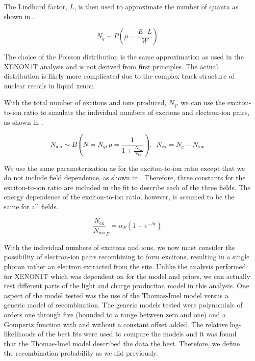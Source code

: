 The Lindhard factor, $L$, is then used to approximate the number of quanta as shown in .

\begin{equation}
        \label{eqn:nerix_nr_quanta}
        N_q \sim P \left( \mu = \frac{E \cdot L}{W} \right)
\end{equation}

The choice of the Poisson distribution is the same approximation as used in the XENON1T analysis and is not derived from first principles.  The actual distribution is likely more complicated due to the complex track structure of nuclear recoils in liquid xenon.

With the total number of excitons and ions produced, $N_q$, we can use the exciton-to-ion ratio to simulate the individual numbers of excitons and electron-ion pairs, as shown in .

\begin{equation}
        \label{eqn:nerix_nr_exciton_ion}
        N_{\textrm{ion}} \sim B \left( N=N_q, p = \frac{1}{1 + \frac{N_{\textrm{ex}}}{N_{\textrm{ion}}}} \right) , \, \, \, N_{\textrm{ex}} = N_q - N_{\textrm{ion}}
\end{equation}

We use the same parameterization as  for the exciton-to-ion ratio except that we do not include field dependence, as shown in .  Therefore, three constants for the exciton-to-ion ratio are included in the fit to describe each of the three fields.  The energy dependence of the exciton-to-ion ratio, however, is assumed to be the same for all fields.

\begin{equation}
        \label{eqn:nerix_nr_exciton_ion_parameterization}
        \frac{N_{\textrm{ex}}}{N_{\textrm{ion}}}_F = \alpha_F \left( 1 - e^{-\beta \epsilon}  \right)
\end{equation}


With the individual numbers of excitons and ions, we now must consider the possibility of electron-ion pairs recombining to form excitons, resulting in a single photon rather an electron extracted from the site.  Unlike the analysis performed for XENON1T which was dependent on  for the model and priors, we can actually test different parts of the light and charge production model in this analysis.  One aspect of the model tested was the use of the Thomas-Imel model \cite{thomas1987recombination} versus a generic model of recombination.  The generic models tested were polynomials of orders one through five (bounded to a range between zero and one) and a Gompertz function \cite{gompertz1825nature} with and without a constant offset added.  The relative log-likelihoods of the best fits were used to compare the models and it was found that the Thomas-Imel model described the data the best.  Therefore, we define the recombination probability as we did previously.

